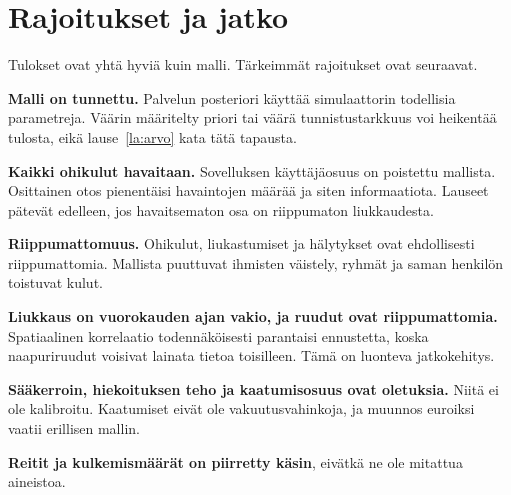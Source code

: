 \documentclass[11pt,a4paper]{article}
\theoremstyle{plain}
\theoremstyle{definition}
\theoremstyle{remark}
\newcommand{\1}{\mathbf{1}}
\begin{document}


\section{Rajoitukset ja jatko}

Tulokset ovat yhtä hyviä kuin malli. Tärkeimmät rajoitukset ovat seuraavat.

\textbf{Malli on tunnettu.} Palvelun posteriori käyttää simulaattorin todellisia
parametreja. Väärin määritelty priori tai väärä tunnistustarkkuus voi heikentää
tulosta, eikä lause~\ref{la:arvo} kata tätä tapausta.

\textbf{Kaikki ohikulut havaitaan.} Sovelluksen käyttäjäosuus on poistettu
mallista. Osittainen otos pienentäisi havaintojen määrää ja siten informaatiota.
Lauseet pätevät edelleen, jos havaitsematon osa on riippumaton liukkaudesta.

\textbf{Riippumattomuus.} Ohikulut, liukastumiset ja hälytykset ovat
ehdollisesti riippumattomia. Mallista puuttuvat ihmisten väistely, ryhmät ja
saman henkilön toistuvat kulut.

\textbf{Liukkaus on vuorokauden ajan vakio, ja ruudut ovat riippumattomia.}
Spatiaalinen korrelaatio todennäköisesti parantaisi ennustetta, koska
naapuriruudut voisivat lainata tietoa toisilleen. Tämä on luonteva jatkokehitys.

\textbf{Sääkerroin, hiekoituksen teho ja kaatumisosuus ovat oletuksia.} Niitä ei
ole kalibroitu. Kaatumiset eivät ole vakuutusvahinkoja, ja muunnos euroiksi
vaatii erillisen mallin.

\textbf{Reitit ja kulkemismäärät on piirretty käsin}, eivätkä ne ole mitattua
aineistoa.
\end{document}

